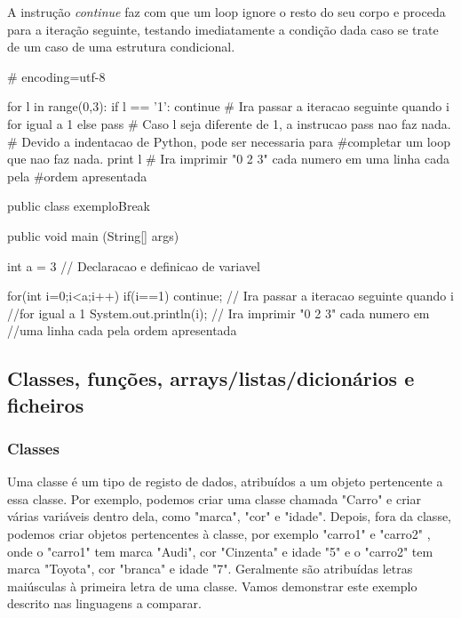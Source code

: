 \documentclass[11pt,openright,twoside]{report}
\begin{document}
A instrução \textit{continue} faz com que um loop ignore o resto do seu corpo e proceda para a iteração seguinte, testando imediatamente a condição dada caso se trate de um caso de uma estrutura condicional.

\smallskip
\begin{Python}
# encoding=utf-8

for l in range(0,3):
	if l == '1':
		continue # Ira passar a iteracao seguinte quando i for igual a 1
	else
		pass	 # Caso l seja diferente de 1, a instrucao pass nao faz nada. 
				 # Devido a indentacao de Python, pode ser necessaria para #completar um loop que nao faz nada.
	print l # Ira imprimir "0 2 3" cada numero em uma linha cada pela #ordem apresentada
\end{Python}
\smallskip

\smallskip
\begin{Java}

public class exemploBreak{
	public void main (String[] args){
		int a = 3 // Declaracao e definicao de variavel
		
		for(int i=0;i<a;i++){
			if(i==1) continue; // Ira passar a iteracao seguinte quando i //for igual a 1 
			System.out.println(i); // Ira imprimir "0 2 3" cada numero em //uma linha cada pela ordem apresentada
		}
	}
}
\end{Java}
\medskip

\subsection{Classes, funções, arrays/listas/dicionários e ficheiros}

\subsubsection{Classes}
Uma classe é um tipo de registo de dados, atribuídos a um objeto pertencente a essa classe. Por exemplo, podemos criar uma classe chamada "Carro" e criar várias variáveis dentro dela, como "marca", "cor" e "idade". Depois, fora da classe, podemos criar objetos pertencentes à classe, por exemplo "carro1" e "carro2" , onde o "carro1" tem marca "Audi", cor "Cinzenta" e idade "5" e o "carro2" tem marca "Toyota", cor "branca" e idade "7".  Geralmente são atribuídas letras maiúsculas à primeira letra de uma classe. Vamos demonstrar este exemplo descrito nas linguagens a comparar.
\end{document}
